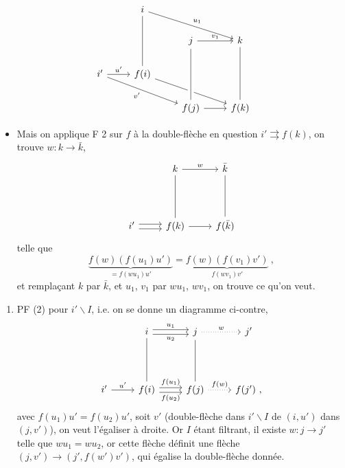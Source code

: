 \documentclass[11pt]{article}
\newcommand{\printedpage}[1]{\marginpar{\footnotesize p.~#1}}
\newcommand{\msp}[1]{\marginpar{\footnotesize [#1]}}
\newcommand{\bs}{\backslash}
\begin{document}
\printedpage{84}

\[
\begin{tikzcd}
{} & i \arrow[drr, "u_1"] \arrow[dd, dash] & {} & {} \\
{} & {} & j \arrow[r, "v_1"] & k \arrow[dd, dash] \\
i' \arrow[r, "u'"] \arrow[drr, "v'"'] & f(i) \arrow[drr] & {} & {} \\
{} & {} & f(j) \arrow[r] \arrow[uu, dash, crossing over] & f(k)
\end{tikzcd}
\]

\begin{itemize}[label={}]
\item \msp{page 229}Mais on applique F 2 sur $f$ à la double-flèche en question $i' \rightrightarrows f(k)$, on trouve $w : k \longrightarrow \bar{k}$,
\[
\begin{tikzcd}
{} & k \arrow[r, "w"] \arrow[dd, dash] & \bar{k} \arrow[dd, dash] \\
{} & {} & {} \\
i' \arrow[r, shift left] \arrow[r, shift right] & f(k) \arrow[r] & f(\bar{k})
\end{tikzcd}
\]
telle que
\[
\underbrace{f(w)(f(u_1)u')}_{= f(wu_1)u'} = \underbrace{f(w)(f(v_1)v')}_{f(wv_1)v'} \ ,
\]
et remplaçant $k$ par $\bar{k}$, et $u_1$, $v_1$ par $wu_1$, $wv_1$, on trouve ce qu'on veut.
\end{itemize}

\begin{enumerate}[label=\arabic*), start=2]
\item PF (2) pour $i'\bs I$, i.e. on se donne un diagramme ci-contre,
\[
\begin{tikzcd}
{} & i \arrow[r, shift left, "u_1"] \arrow[r, shift right, "u_2"'] \arrow[dd, dash] & j \arrow[r, dotted, "w"] \arrow[dd, dash] & j' \\
{} & {} & {} & {} \\
i' \arrow[r, "u'"] & f(i) \arrow[r, shift left, "f(u_1)"] \arrow[r, shift right, "f(u_2)"'] & f(j) \arrow[r, dotted, "f(w)"] & f(j') \ ,
\end{tikzcd}
\]
avec $f(u_1)u' = f(u_2)u'$, soit $v'$ (double-flèche dans $i'\bs I$ de $(i,u')$ dans $(j,v')$), on veut l'égaliser à droite. Or $I$ étant filtrant, il existe $w : j \longrightarrow j'$ telle que $wu_1 = wu_2$, or cette flèche définit une flèche $(j,v') \longrightarrow (j', f(w')v')$, qui égalise la double-flèche donnée. %
\end{enumerate}
\end{document}
